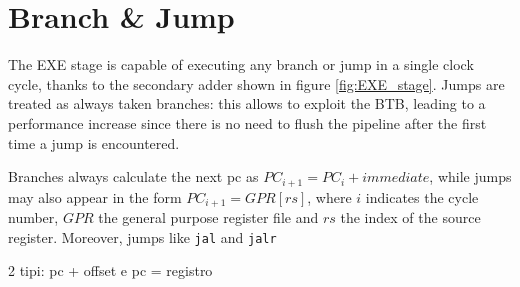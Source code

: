 \section{Branch \& Jump}

The EXE stage is capable of executing any branch or jump in a single clock cycle, thanks to the secondary adder shown in figure \ref{fig:EXE_stage}.
Jumps are treated as always taken branches: this allows to exploit the BTB, leading to a performance increase since there is no need to flush the pipeline
after the first time a jump is encountered.

Branches always calculate the next pc as $PC_{i+1} = PC_{i} + immediate$, while jumps may also appear in the form $PC_{i+1} = GPR[rs]$, where $i$ indicates
the cycle number, $GPR$ the general purpose register file and $rs$ the index of the source register. Moreover, jumps like \verb|jal| and \verb|jalr| 

2 tipi: pc + offset e pc = registro




